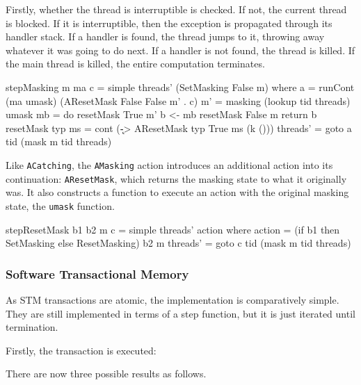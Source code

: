 Firstly, whether the thread is interruptible is checked. If not, the
current thread is blocked. If it is interruptible, then the exception
is propagated through its handler stack. If a handler is found, the
thread jumps to it, throwing away whatever it was going to do next. If
a handler is not found, the thread is killed. If the main thread is
killed, the entire computation terminates.

\begin{haskellcode}
stepMasking m ma c = simple threads' (SetMasking False m) where
  a = runCont (ma umask) (AResetMask False False m' . c)
  m' = masking (lookup tid threads)
  umask mb = do
    resetMask True m'
    b <- mb
    resetMask False m
    return b
  resetMask typ ms = cont (\k -> AResetMask typ True ms (k ()))
  threads' = goto a tid (mask m tid threads)
\end{haskellcode}

Like \verb|ACatching|, the \verb|AMasking| action introduces an
additional action into its continuation: \verb|AResetMask|, which
returns the masking state to what it originally was. It also
constructs a function to execute an action with the original masking
state, the \verb|umask| function.

\begin{haskellcode}
stepResetMask b1 b2 m c = simple threads' action where
  action   = (if b1 then SetMasking else ResetMasking) b2 m
  threads' = goto c tid (mask m tid threads)
\end{haskellcode}

\subsubsection{Software Transactional Memory}
\label{sec:execution-stepwise-stm}

As STM transactions are atomic, the implementation is comparatively
simple. They are still implemented in terms of a step function, but it
is just iterated until termination.

Firstly, the transaction is executed:


There are now three possible results as follows.

